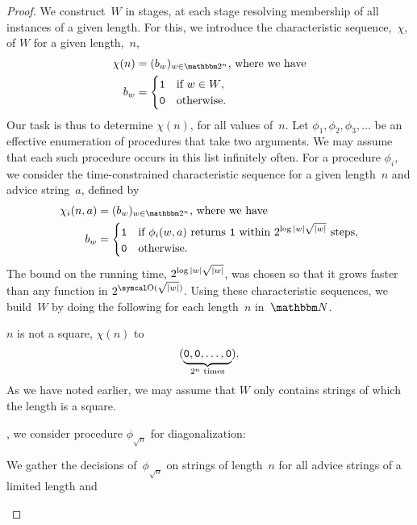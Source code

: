 \begin{proof}
  We construct~$W$ in stages, at each stage resolving membership of all instances of a given length.
  For this, we introduce the characteristic sequence,~$\chi$, of $W$ for a given length,~$n$,
  \begin{align*}
    \chi(n) &\deq (b_w)_{w \in \binary^n}\text{, where we have} \\
    b_w &= \begin{cases}
      \bits{1}	&\text{if $w \in W$}, \\
      \bits{0}	&\text{otherwise}.
    \end{cases}
  \end{align*}
  Our task is thus to determine $\chi(n)$, for all values of~$n$.
  Let $\phi_1, \phi_2, \phi_3, \ldots$ be an effective enumeration of procedures that take two arguments.
  We may assume that each such procedure occurs in this list infinitely often.
  For a procedure $\phi_i$, we consider the time-constrained characteristic sequence for a given length~$n$ and advice string~$a$, defined by
  \begin{align*}
    \chi_i(n, a) &\deq (b_w)_{w \in \binary^n}\text{, where we have} \\
    b_w &= \begin{cases}
      \bits{1}	&\text{if $\phi_i(w, a)$ returns \bits{1} within $2^{\log\length{w} \sqrt{\length{w}}}$ steps}, \\
      \bits{0}	&\text{otherwise}.
    \end{cases}
  \end{align*}
  The bound on the running time, $2^{\log{\lvert w\rvert} \sqrt{{\lvert w\rvert}}}$, was chosen so that it grows faster than any function in $2^{\bigO(\sqrt{\length{w}})}$.
  Using these characteristic sequences, we build~$W$ by doing the following for each length~$n$ in~$\bbN$.
  \begin{codelisting}
  \item
     $n$ is not a square,  $\chi(n)$ to
    \begin{equation*}
      (\underbrace{\vphantom{()}\bits{0}, \bits{0}, \ldots, \bits{0}}_{2^n\text{ times}}).
    \end{equation*}
    As we have noted earlier, we may assume that $W$ only contains strings of which the length is a square.
  \item
    , we consider procedure $\phi_{\sqrt{n}}$ for diagonalization:
    \begin{codelisting}
    \item
      We gather the decisions of~$\phi_{\sqrt{n}}$ on strings of length~$n$ for all advice strings of a limited length and 

\end{codelisting}
\end{codelisting}
\end{proof}
